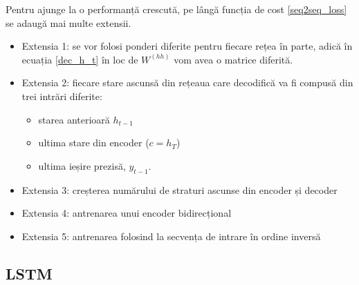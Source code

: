 Pentru ajunge la o performanță crescută, pe lângă funcția de cost \ref{seq2seq_loss} se adaugă mai multe extensii.
\begin{itemize}
	\item Extensia 1: se vor folosi ponderi diferite pentru fiecare rețea în parte, adică în ecuația \ref{dec_h_t} în loc de $W^{(hh)}$ vom avea o matrice diferită.
	\item Extensia 2: fiecare stare ascunsă din rețeaua care decodifică va fi compusă din trei intrări diferite:
	\begin{itemize}
		\item starea anterioară $h_{t-1}$
		\item ultima stare din encoder ($c=h_T$)
		\item ultima ieșire prezisă, $y_{t-1}$.
	\end{itemize}
	\item Extensia 3: creșterea numărului de straturi ascunse din encoder și decoder
	\item Extensia 4: antrenarea unui encoder bidirecțional
	\item Extensia 5: antrenarea folosind la secvența de intrare în ordine inversă
\end{itemize}


\subsection{LSTM}










































